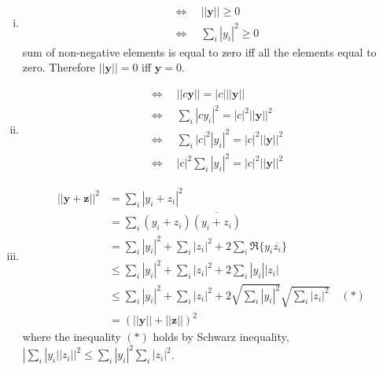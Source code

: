 \documentclass[12pt, letterpaper]{scrartcl}
\begin{document}
\begin{enumerate}[(i)]
    \item 
    \begin{align*}
        &\Longleftrightarrow\quad ||\bm{y}||\geq0\\
        &\Longleftrightarrow\quad \sum_i|y_i|^2\geq0
    \end{align*}
    sum of non-negative elements is equal to zero iff all the elements equal to zero. Therefore $||\bm{y}||=0$ iff $\bm{y}=0$.
    \item 
    \begin{align*}
        &\Longleftrightarrow\quad ||c\bm{y}||=|c|||\bm{y}||\\
        &\Longleftrightarrow\quad \sum_i|cy_i|^2=|c|^2||\bm{y}||^2\\
        &\Longleftrightarrow\quad \sum_i|c|^2|y_i|^2=|c|^2||\bm{y}||^2\\
        &\Longleftrightarrow\quad |c|^2\sum_i|y_i|^2=|c|^2||\bm{y}||^2
    \end{align*}
    \item 
    \begin{align*}
        ||\bm{y}+\bm{z}||^2&=\sum_i|y_i+z_i|^2\\
        &=\sum_i(y_i+z_i)\overline{(y_i+z_i)}\\
        &=\sum_i |y_i|^2+\sum_i |z_i|^2+2\sum_i \Re\{y_i\overline{z_i}\} \\
        &\leq \sum_i |y_i|^2+\sum_i |z_i|^2+2\sum_i |y_i||z_i|\\
        &\leq \sum_i |y_i|^2+\sum_i |z_i|^2+2\sqrt{\sum_i |y_i|^2}\sqrt{\sum_i |z_i|^2}\quad (*)\\
        &=(||\bm y||+||\bm z||)^2
        \end{align*}
    where the inequality $(*)$ holds by Schwarz inequality, $|\sum_i |y_i||z_i||^2\leq\sum_i |y_i|^2\sum_i |z_i|^2$.
\end{enumerate}
\end{document}
